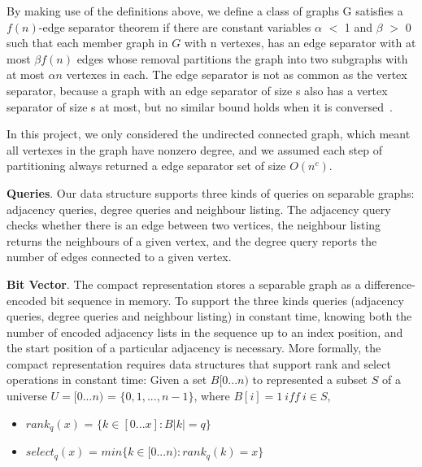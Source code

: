 \documentclass[12pt,glossary]{dalthesis}
\begin{document}
\bigskip
\bigskip

By making use of the definitions above, we define a class of graphs G satisfies a $f(n)$-edge separator theorem if there are constant variables $\alpha$ $<$ 1 and $\beta$ $>$ 0 such that each member graph in $G$ with n vertexes, has an edge separator with at most $\beta f(n)$ edges whose removal partitions the graph into two subgraphs with at most $\alpha n$ vertexes in each. The edge separator is not as common as the vertex separator, because a graph with an edge separator of size s also has a vertex separator of size s at most, but no similar bound holds when it is conversed~\cite{compact-representation}.

\bigskip
\bigskip

In this project, we only considered the undirected connected graph, which meant all vertexes in the graph have nonzero degree, and we assumed each step of partitioning always returned a edge separator set of size $O(n^{c})$.

\bigskip
\bigskip

\textbf{Queries}. Our data structure supports three kinds of queries on separable graphs: adjacency queries, degree queries and neighbour listing. The adjacency query checks whether there is an edge between two vertices, the neighbour listing returns the neighbours of a given vertex, and the degree query reports the number of edges connected to a given vertex.

\bigskip
\bigskip

\textbf{Bit Vector}. The compact representation stores a separable graph as a difference-encoded bit sequence in memory. To support the three kinds queries (adjacency queries, degree queries and neighbour listing) in constant time, knowing both the number of encoded adjacency lists in the sequence up to an index position, and the start position of a particular adjacency is necessary. More formally, the compact representation requires data structures that support rank and select operations in constant time: Given a set $B[0...n)$ to represented a subset $S$ of a universe $U = [0...n)$ = $\{0,1,...,n-1 \}$, where $B[i] = 1 \ iff \ i \in S$,

\begin{itemize}[noitemsep]
\item $rank_{q}(x)$ = $\{k \in [0...x] : B|k| = q \}$
\item $select_{q}(x)$ = $ min \{ k \in [0...n) : rank_{q}(k) = x \} $ 
\end{itemize}
\end{document}
